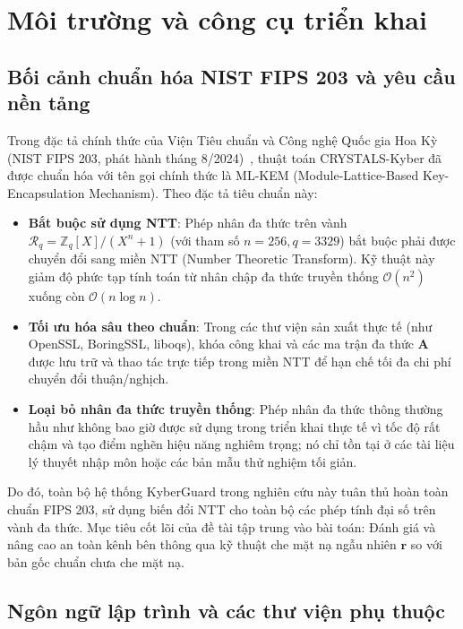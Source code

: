 \documentclass[../LuanVan.tex]{subfiles}
\begin{document}
\section{Môi trường và công cụ triển khai}
\label{sec:moitruong}

\subsection{Bối cảnh chuẩn hóa NIST FIPS 203 và yêu cầu nền tảng}

Trong đặc tả chính thức của Viện Tiêu chuẩn và Công nghệ Quốc gia Hoa Kỳ (NIST FIPS 203, phát hành tháng 8/2024)~\cite{FIPS203}, thuật toán CRYSTALS-Kyber đã được chuẩn hóa với tên gọi chính thức là ML-KEM (Module-Lattice-Based Key-Encapsulation Mechanism). Theo đặc tả tiêu chuẩn này:
\begin{itemize}[leftmargin=2cm]
    \item \textbf{Bắt buộc sử dụng NTT}: Phép nhân đa thức trên vành $\mathcal{R}_q = \mathbb{Z}_q[X]/(X^n+1)$ (với tham số $n=256, q=3329$) bắt buộc phải được chuyển đổi sang miền NTT (Number Theoretic Transform). Kỹ thuật này giảm độ phức tạp tính toán từ nhân chập đa thức truyền thống $\mathcal{O}(n^2)$ xuống còn $\mathcal{O}(n \log n)$.
    \item \textbf{Tối ưu hóa sâu theo chuẩn}: Trong các thư viện sản xuất thực tế (như OpenSSL, BoringSSL, liboqs), khóa công khai và các ma trận đa thức $\mathbf{A}$ được lưu trữ và thao tác trực tiếp trong miền NTT để hạn chế tối đa chi phí chuyển đổi thuận/nghịch.
    \item \textbf{Loại bỏ nhân đa thức truyền thống}: Phép nhân đa thức thông thường hầu như không bao giờ được sử dụng trong triển khai thực tế vì tốc độ rất chậm và tạo điểm nghẽn hiệu năng nghiêm trọng; nó chỉ tồn tại ở các tài liệu lý thuyết nhập môn hoặc các bản mẫu thử nghiệm tối giản.
\end{itemize}

Do đó, toàn bộ hệ thống KyberGuard trong nghiên cứu này tuân thủ hoàn toàn chuẩn FIPS 203, sử dụng biến đổi NTT cho toàn bộ các phép tính đại số trên vành đa thức. Mục tiêu cốt lõi của đề tài tập trung vào bài toán: Đánh giá và nâng cao an toàn kênh bên thông qua kỹ thuật che mặt nạ ngẫu nhiên $\mathbf{r}$ so với bản gốc chuẩn chưa che mặt nạ.

\subsection{Ngôn ngữ lập trình và các thư viện phụ thuộc}
\end{document}
